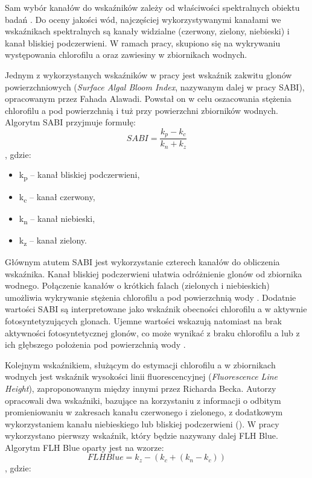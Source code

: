 \documentclass{amuthesis}
\begin{document}
Sam wybór kanałów do wskaźników zależy od właściwości spektralnych
obiektu badań \autocite{bijeesh2019comparative}. Do oceny jakości wód,
najczęściej wykorzystywanymi kanałami we wskaźnikach spektralnych są
kanały widzialne (czerwony, zielony, niebieski) i kanał bliskiej
podczerwieni. W ramach pracy, skupiono się na wykrywaniu występowania
chlorofilu a oraz zawiesiny w zbiornikach wodnych.

Jednym z wykorzystanych wskaźników w pracy jest wskaźnik zakwitu glonów
powierzchniowych (\emph{Surface Algal Bloom Index}, nazywanym dalej w
pracy SABI), opracowanym przez Fahada Alawadi. Powstał on w celu
oszacowania stężenia chlorofilu a pod powierzchnią i tuż przy
powierzchni zbiorników wodnych. Algorytm SABI przyjmuje formułę: \[
SABI = \frac{k_p - k_c}{k_n + k_z}
\] , gdzie:

\begin{itemize}
\tightlist
\item
  k\textsubscript{p} -- kanał bliskiej podczerwieni,
\item
  k\textsubscript{c} -- kanał czerwony,
\item
  k\textsubscript{n} -- kanał niebieski,
\item
  k\textsubscript{z} -- kanał zielony.
\end{itemize}

Głównym atutem SABI jest wykorzystanie czterech kanałów do obliczenia
wskaźnika. Kanał bliskiej podczerwieni ułatwia odróżnienie glonów od
zbiornika wodnego. Połączenie kanałów o krótkich falach (zielonych i
niebieskich) umożliwia wykrywanie stężenia chlorofilu a pod powierzchnią
wody \autocite{alawadi2010detection}. Dodatnie wartości SABI są
interpretowane jako wskaźnik obecności chlorofilu a w aktywnie
fotosyntetyzujących glonach. Ujemne wartości wskazują natomiast na brak
aktywności fotosyntetycznej glonów, co może wynikać z braku chlorofilu a
lub z ich głębszego położenia pod powierzchnią wody
\autocite{alawadi2010detection}.

Kolejnym wskaźnikiem, służącym do estymacji chlorofilu a w zbiornikach
wodnych jest wskaźnik wysokości linii fluorescencyjnej
(\emph{Fluorescence Line Height}), zaproponowanym między innymi przez
Richarda Becka. Autorzy opracowali dwa wskaźniki, bazujące na
korzystaniu z informacji o odbitym promieniowaniu w zakresach kanału
czerwonego i zielonego, z dodatkowym wykorzystaniem kanału niebieskiego
lub bliskiej podczerwieni (\textcite{beck2016comparison}). W pracy
wykorzystano pierwszy wskaźnik, który będzie nazywany dalej FLH Blue.
Algorytm FLH Blue oparty jest na wzorze: \[
FLH Blue = k_z - (k_c + (k_n - k_c))
\] , gdzie:
\end{document}
